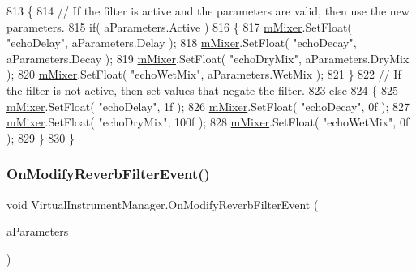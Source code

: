 \begin{DoxyCode}
813     \{
814         \textcolor{comment}{// If the filter is active and the parameters are valid, then use the new parameters.}
815         \textcolor{keywordflow}{if}( aParameters.Active )
816         \{
817             \hyperlink{group___v_i_m_priv_ga08c8db1bb89f4ab1e28451dd93d6b99c}{mMixer}.SetFloat( \textcolor{stringliteral}{"echoDelay"}, aParameters.Delay );
818             \hyperlink{group___v_i_m_priv_ga08c8db1bb89f4ab1e28451dd93d6b99c}{mMixer}.SetFloat( \textcolor{stringliteral}{"echoDecay"}, aParameters.Decay );
819             \hyperlink{group___v_i_m_priv_ga08c8db1bb89f4ab1e28451dd93d6b99c}{mMixer}.SetFloat( \textcolor{stringliteral}{"echoDryMix"}, aParameters.DryMix );
820             \hyperlink{group___v_i_m_priv_ga08c8db1bb89f4ab1e28451dd93d6b99c}{mMixer}.SetFloat( \textcolor{stringliteral}{"echoWetMix"}, aParameters.WetMix );
821         \}
822         \textcolor{comment}{// If the filter is not active, then set values that negate the filter.}
823         \textcolor{keywordflow}{else}
824         \{
825             \hyperlink{group___v_i_m_priv_ga08c8db1bb89f4ab1e28451dd93d6b99c}{mMixer}.SetFloat( \textcolor{stringliteral}{"echoDelay"}, 1f );
826             \hyperlink{group___v_i_m_priv_ga08c8db1bb89f4ab1e28451dd93d6b99c}{mMixer}.SetFloat( \textcolor{stringliteral}{"echoDecay"}, 0f );
827             \hyperlink{group___v_i_m_priv_ga08c8db1bb89f4ab1e28451dd93d6b99c}{mMixer}.SetFloat( \textcolor{stringliteral}{"echoDryMix"}, 100f );
828             \hyperlink{group___v_i_m_priv_ga08c8db1bb89f4ab1e28451dd93d6b99c}{mMixer}.SetFloat( \textcolor{stringliteral}{"echoWetMix"}, 0f );
829         \}
830     \}
\end{DoxyCode}
\mbox{\label{group___v_i_m_handlers_ga2b310217971075b1b2db67d68fbbea5a}} 
\subsubsection{\texorpdfstring{On\+Modify\+Reverb\+Filter\+Event()}{OnModifyReverbFilterEvent()}}
{\footnotesize\ttfamily void Virtual\+Instrument\+Manager.\+On\+Modify\+Reverb\+Filter\+Event (\begin{DoxyParamCaption}\item[{\hyperlink{group__filter_params_struct_virtual_instrument_manager_1_1_reverb_filter_parameters}{Reverb\+Filter\+Parameters}}]{a\+Parameters }\end{DoxyParamCaption})}



